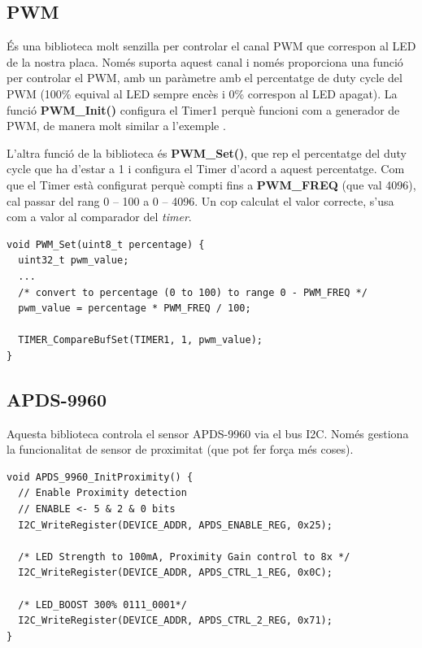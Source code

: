 \subsection{PWM}
És una biblioteca molt senzilla per controlar el canal PWM que correspon al LED de la nostra placa. Només suporta aquest canal i només proporciona una funció per controlar el PWM, amb un paràmetre amb el percentatge de \gls{duty cycle} del PWM (100\% equival al LED sempre encès i 0\% correspon al LED apagat).
La funció {\bf PWM\_Init()} configura el Timer1 perquè funcioni com a generador de \gls{PWM}, de manera molt similar a l'exemple .

L'altra funció de la biblioteca és {\bf PWM\_Set()}, que rep el percentatge del \gls{duty cycle} que ha d'estar a 1 i configura el Timer d'acord a aquest percentatge. Com que el Timer està configurat perquè compti fins a {\bf PWM\_FREQ} (que val 4096), cal passar del rang 0 -- 100 a 0 -- 4096. Un cop calculat el valor correcte, s'usa com a valor al comparador del {\em timer}.

\begin{lstlisting}[style=customc,caption={Funció PWM\_Set()},label=PWMSet]
void PWM_Set(uint8_t percentage) {
  uint32_t pwm_value;
  ...
  /* convert to percentage (0 to 100) to range 0 - PWM_FREQ */
  pwm_value = percentage * PWM_FREQ / 100;

  TIMER_CompareBufSet(TIMER1, 1, pwm_value);
}
\end{lstlisting}


\subsection{APDS-9960}
Aquesta biblioteca controla el sensor APDS-9960 via el bus \gls{I2C}. Només gestiona la funcionalitat de sensor de proximitat (que pot fer força més coses).

\begin{lstlisting}[caption={Funció {\bf APDS\_9960\_InitProximity()}},style=customc,label=InitProximity]
void APDS_9960_InitProximity() {
  // Enable Proximity detection
  // ENABLE <- 5 & 2 & 0 bits
  I2C_WriteRegister(DEVICE_ADDR, APDS_ENABLE_REG, 0x25);

  /* LED Strength to 100mA, Proximity Gain control to 8x */
  I2C_WriteRegister(DEVICE_ADDR, APDS_CTRL_1_REG, 0x0C);

  /* LED_BOOST 300% 0111_0001*/
  I2C_WriteRegister(DEVICE_ADDR, APDS_CTRL_2_REG, 0x71);
}
\end{lstlisting}

